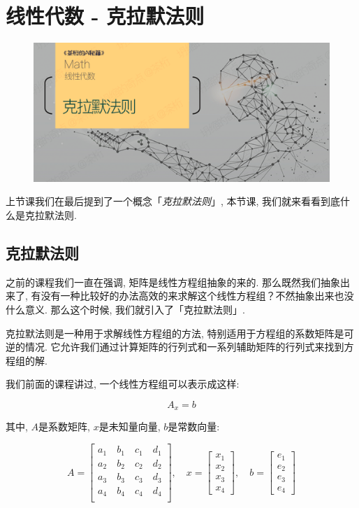 \chapter{线性代数 - 克拉默法则}

\begin{figure}[ht]
  \centering
  \includegraphics[width=1\linewidth]{asset/茶桁的AI秘籍_Math_15.png}
\end{figure}

\newpage

上节课我们在最后提到了一个概念「\textit{克拉默法则}」, 本节课, 我们就来看看到底什么是克拉默法则. 

\hypertarget{15.线性代数}{}
\section{克拉默法则}

之前的课程我们一直在强调, 矩阵是线性方程组抽象的来的. 那么既然我们抽象出来了, 有没有一种比较好的办法高效的来求解这个线性方程组？不然抽象出来也没什么意义. 那么这个时候, 我们就引入了「克拉默法则」. 

克拉默法则是一种用于求解线性方程组的方法, 特别适用于方程组的系数矩阵是可逆的情况. 它允许我们通过计算矩阵的行列式和一系列辅助矩阵的行列式来找到方程组的解. 

我们前面的课程讲过, 一个线性方程组可以表示成这样: 

\[
  A_x = b
\]

其中, $A$是系数矩阵, $x$是未知量向量, $b$是常数向量: 

\[
  A = 
  \begin{bmatrix}
  a_1 \quad b_1 \quad c_1 \quad  d_1 \\
  a_2 \quad b_2 \quad c_2 \quad  d_2 \\ 
  a_3 \quad b_3 \quad c_3 \quad  d_3 \\
  a_4 \quad b_4 \quad c_4 \quad  d_4 \\
  \end{bmatrix}, \quad
  x = 
  \begin{bmatrix}
  x_1 \\
  x_2 \\
  x_3 \\
  x_4
  \end{bmatrix}, \quad
  b = 
  \begin{bmatrix}
  e_1 \\
  e_2 \\
  e_3 \\
  e_4
  \end{bmatrix}
\]

